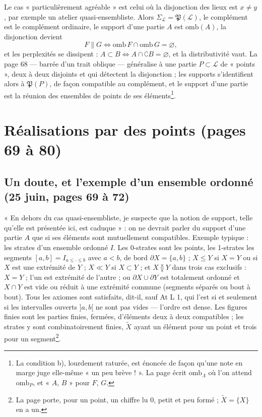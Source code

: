 \documentclass[11pt,a4paper]{article}
\begin{document}
Le cas « particulièrement agréable » est celui où la disjonction des lieux est $x
\neq y$, par exemple un atelier quasi-ensembliste. Alors $\Sigma_{\mathcal{L}} =
\mathfrak{P}(\mathcal{L})$, le complément est le complément ordinaire, le support
d'une partie $A$ est $\mathrm{omb}(A)$, la disjonction devient
\[
F \parallel G \iff \mathrm{omb}\, F \cap \mathrm{omb}\, G = \varnothing ,
\]
et les perplexités se dissipent : $A \subset B \iff A \cap \complement B =
\varnothing$, et la distributivité vaut. La page 68 --- barrée d'un trait oblique
--- généralise à une partie $P \subset \mathcal{L}$ de « points », deux à deux
disjoints et qui détectent la disjonction ; les supports s'identifient alors à
$\mathfrak{P}(P)$, de façon compatible au complément, et le support d'une partie
est la réunion des ensembles de points de ses éléments\footnote{La condition b),
lourdement raturée, est énoncée de façon qu'une note en marge juge elle-même « un
peu brève ! ». La page écrit $\mathrm{omb}_{\Lambda}$ où l'on attend
$\mathrm{omb}_{P}$, et « $A$, $B$ » pour $F$, $G$.}.

\section*{Réalisations par des points (pages 69 à 80)}

\subsection*{Un doute, et l'exemple d'un ensemble ordonné (25 juin, pages 69 à 72)}

« En dehors du cas quasi-ensembliste, je suspecte que la notion de support,
telle qu'elle est présentée ici, est caduque » : on ne devrait parler du support
d'une partie $A$ que si ses éléments sont mutuellement compatibles. Exemple
typique : les strates d'un ensemble ordonné $I$. Les 0-strates sont les points,
les 1-strates les segments $[a, b] = I_{a \leq \cdot \leq b}$ avec $a < b$, de bord
$\partial X = \{a, b\}$ ; $X \leq Y$ si $X = Y$ ou si $X$ est une extrémité de $Y$
; $X \ll Y$ si $X \subset Y$ ; et $X \between Y$ dans trois cas exclusifs : $X =
Y$ ; l'un est extrémité de l'autre ; ou $\partial X \cup \partial Y$ est
totalement ordonné et $X \cap Y$ est vide ou réduit à une extrémité commune
(segments séparés ou bout à bout). Tous les axiomes sont satisfaits, dit-il, sauf
At L 1, qui l'est si et seulement si les intervalles ouverts $]a, b[$ ne sont pas
vides --- l'ordre est dense. Les figures finies sont les parties finies, fermées,
d'éléments deux à deux compatibles ; les strates y sont combinatoirement finies,
$\widetilde{X}$ ayant un élément pour un point et trois pour un
segment\footnote{La page porte, pour un point, un chiffre lu $0$, petit et peu
formé ; $\widetilde{X} = \{X\}$ en a un.}.
\end{document}
